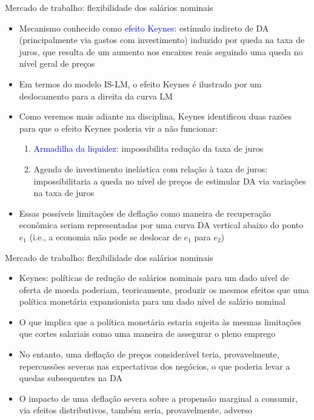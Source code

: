 \documentclass[10pt]{beamer}
\begin{document}
\begin{frame}{Mercado de trabalho: flexibilidade dos salários nominais}
    \begin{itemize}
        \item Mecanismo conhecido como \textcolor{blue}{efeito Keynes}: estímulo indireto de DA (principalmente via gastos com investimento) induzido por queda na taxa de juros, que resulta de um aumento nos encaixes reais seguindo uma queda no nível geral de preços
        \bigskip
        \item Em termos do modelo IS-LM, o efeito Keynes é ilustrado por um deslocamento para a direita da curva LM
        \bigskip
        \item Como veremos mais adiante na disciplina, Keynes identificou duas razões para que o efeito Keynes poderia vir a não funcionar:
        \bigskip
        \begin{enumerate}
            \item \textcolor{blue}{Armadilha da liquidez}: impossibilita redução da taxa de juros
            \medskip
            \item Agenda de investimento inelástica com relação à taxa de juros: impossibilitaria a queda no nível de preços de estimular DA via variações na taxa de juros
        \end{enumerate}
        \bigskip
        \item Essas possíveis limitações de deflação como maneira de recuperação econômica seriam representadas por uma curva DA vertical abaixo do ponto $e_1$ (i.e., a economia não pode se deslocar de $e_1$ para $e_2$)
    \end{itemize}
\end{frame}

\begin{frame}{Mercado de trabalho: flexibilidade dos salários nominais}
    \begin{itemize}
        \item Keynes: políticas de redução de salários nominais para um dado nível de oferta de moeda poderiam, teoricamente, produzir os mesmos efeitos que uma política monetária expansionista para um dado nível de salário nominal
        \bigskip
        \item O que implica que a política monetária estaria sujeita às mesmas limitações que cortes salariais como uma maneira de assegurar o pleno emprego
        \bigskip
        \item No entanto, uma deflação de preços considerável teria, provavelmente, repercussões severas nas expectativas dos negócios, o que poderia levar a quedas subsequentes na DA
        \bigskip
        \item O impacto de uma deflação severa sobre a propensão marginal a consumir, via efeitos distributivos, também seria, provavelmente, adverso
    \end{itemize}
\end{frame}
\end{document}

